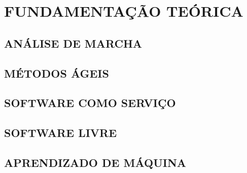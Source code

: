 \chapter[FUNDAMENTAÇÃO TEÓRICA]{\textbf {FUNDAMENTAÇÃO TEÓRICA}}

\section{ANÁLISE DE MARCHA}
\section{MÉTODOS ÁGEIS}
\section{SOFTWARE COMO SERVIÇO}
\section{SOFTWARE LIVRE} 
\section{APRENDIZADO DE MÁQUINA}


\begin{comment}

\end{comment}
